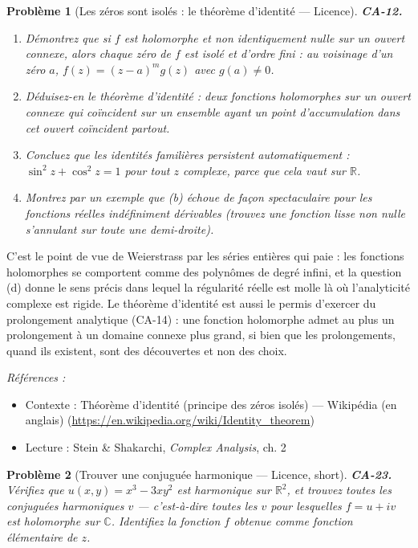 \documentclass[11pt]{article}
\newtheorem{problem}{Problème}
\newenvironment{refs}{\par\small\noindent\emph{Références :}\begin{itemize}\setlength\itemsep{0pt}}{\end{itemize}\normalsize}
\begin{document}
\bigskip

\begin{problem}[{Les zéros sont isolés : le théorème d'identité --- Licence}]
\textbf{CA-12.} \begin{enumerate}
\item[(a)] Démontrez que si $ f $ est holomorphe et non
identiquement nulle sur un ouvert connexe, alors chaque zéro de $ f $ est isolé et d'ordre fini :
au voisinage d'un zéro $ a $, $ f(z) = (z - a)^m g(z) $ avec $ g(a) \ne 0 $.
\item[(b)] Déduisez-en le
théorème d'identité : deux fonctions holomorphes sur un ouvert connexe qui coïncident sur un
ensemble ayant un point d'accumulation dans cet ouvert coïncident partout.
\item[(c)] Concluez que les identités familières persistent
automatiquement : $ \sin^2 z + \cos^2 z = 1 $ pour tout $ z $ complexe, parce que cela vaut sur
$ \mathbb{R} $.
\item[(d)] Montrez par un exemple que (b) échoue de façon spectaculaire pour les fonctions réelles
indéfiniment dérivables (trouvez une fonction lisse non nulle s'annulant sur toute une
demi-droite).
\end{enumerate}

\end{problem}

\noindent C'est le point de vue de Weierstrass par les séries entières qui paie : les
fonctions holomorphes se comportent comme des polynômes de degré infini, et la question (d) donne le
sens précis dans lequel la régularité réelle est molle là où l'analyticité complexe est rigide. Le
théorème d'identité est aussi le permis d'exercer du prolongement analytique (CA-14) : une fonction
holomorphe admet au plus un prolongement à un domaine connexe plus grand, si bien que les
prolongements, quand ils existent, sont des découvertes et non des choix.

\begin{refs}
\item Contexte : Théorème d'identité (principe des zéros isolés) --- Wikipédia (en anglais) (\url{https://en.wikipedia.org/wiki/Identity_theorem})
\item Lecture : Stein \& Shakarchi, \textit{Complex Analysis}, ch. 2
\end{refs}

\bigskip

\begin{problem}[{Trouver une conjuguée harmonique --- Licence, short}]
\textbf{CA-23.} Vérifiez que $ u(x, y) = x^3 - 3xy^2 $ est harmonique sur
$ \mathbb{R}^2 $, et trouvez toutes les conjuguées harmoniques $ v $ --- c'est-à-dire toutes les
$ v $ pour lesquelles $ f = u + iv $ est holomorphe sur $ \mathbb{C} $. Identifiez la fonction
$ f $ obtenue comme fonction élémentaire de $ z $.
\end{problem}
\end{document}
